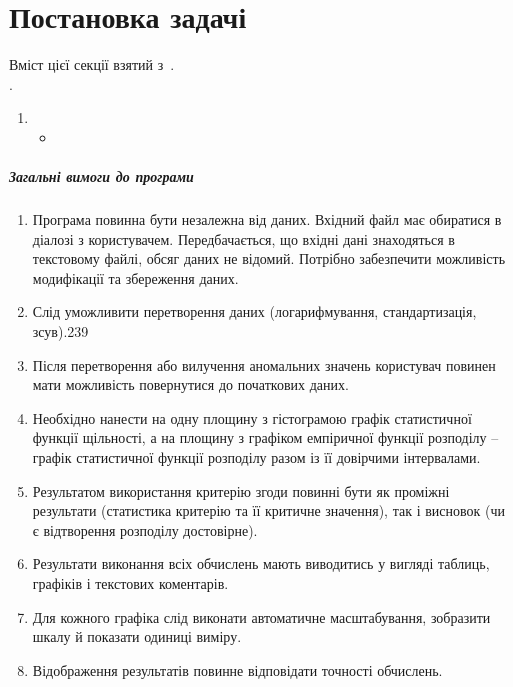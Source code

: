 \documentclass[../../../../document]{subfiles}
\begin{document}
	\chapter{Постановка задачі}
	Вміст цієї секції взятий з~\cite{pristavka_matstat}.\\
	 \worktheme.\\
	\begin{enumerate}
		\item
			\begin{itemize}
				\item 
			\end{itemize}
	\end{enumerate}

	\paragraph*{Загальні вимоги до програми}
	\begin{enumerate}
		\item Програма повинна бути незалежна від даних. Вхідний файл має
			обиратися в діалозі з користувачем. Передбачається, що вхідні дані знаходяться
			в текстовому файлі, обсяг даних не відомий. Потрібно забезпечити можливість
			модифікації та збереження даних.
		\item Слід уможливити перетворення даних (логарифмування,
			стандартизація, зсув).239
		\item Після перетворення або вилучення аномальних значень користувач
			повинен мати можливість повернутися до початкових даних.
		\item Необхідно нанести на одну площину з гістограмою графік статистичної
			функції щільності, а на площину з графіком емпіричної функції розподілу –
			графік статистичної функції розподілу разом із її довірчими інтервалами.
		\item Результатом використання критерію згоди повинні бути як проміжні
			результати (статистика критерію та її критичне значення), так і висновок (чи є
			відтворення розподілу достовірне).
		\item Результати виконання всіх обчислень мають виводитись у вигляді
			таблиць, графіків і текстових коментарів.
		\item Для кожного графіка слід виконати автоматичне масштабування,
			зобразити шкалу й показати одиниці виміру.
		\item Відображення результатів повинне відповідати точності обчислень.
	\end{enumerate}
\end{document}
